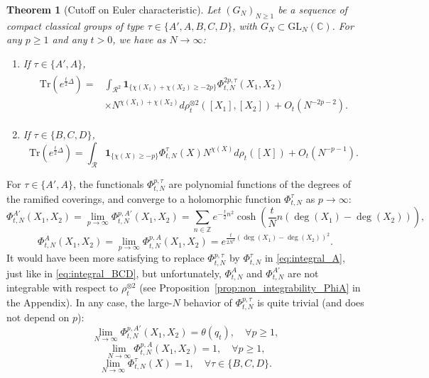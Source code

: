 \documentclass[11pt,a4paper,reqno]{article}
\newtheorem{theorem}{Theorem}[section]
\theoremstyle{definition}
\theoremstyle{remark}
\newcommand\GL{{\mathrm{GL}}}
\newcommand\Z{{\mathbb Z}}
\newcommand\C{\mathbb{C}}
\newcommand\Tr{\mathrm{Tr}}
\begin{document}
\begin{theorem}[Cutoff on Euler characteristic]\label{thm:mainbis}
Let $(G_N)_{N \geq 1}$ be a sequence of compact classical groups of type $\tau\in\{A',A,B,C,D\}$, with $G_N\subset\GL_N(\C)$. For any $p\geq 1$ and any $t>0$, we have as $N\to\infty$:
\begin{enumerate}
\item If $\tau\in\{A',A\}$, 
\begin{align}\label{eq:integral_A}
\begin{split}
\Tr(e^{\frac{t}{2}\Delta})= & \int_{\mathcal{R}^2}\mathbf{1}_{\{\chi(X_1)+\chi(X_2)\geq -2p\}} \Phi_{t,N}^{2p,\tau}(X_1,X_2)\\
&\times N^{\chi(X_1)+\chi(X_2)}d\rho_t^{\otimes 2}([X_1],[X_2])+O_t(N^{-2p-2}).
\end{split}
\end{align}
\item If $\tau\in\{B,C,D\}$, 
\begin{equation}\label{eq:integral_BCD}
\Tr(e^{\frac{t}{2}\Delta})=\int_{\mathcal{R}}\mathbf{1}_{\{\chi(X)\geq -p\}}\Phi_{t,N}^{\tau}(X)N^{\chi(X)}d\rho_t([X])+O_t(N^{-p-1}).
\end{equation}
\end{enumerate}
\end{theorem}

For $\tau\in\{A',A\}$, the functionals $\Phi_{t,N}^{p,\tau}$ are polynomial functions of the degrees of the ramified coverings, and converge to a holomorphic function $\Phi_{t,N}^{\tau}$ as $p\to\infty$:
\begin{equation}
\label{def:phiA'}
\Phi_{t,N}^{A'}(X_1,X_2)=\lim_{p\to\infty}\Phi_{t,N}^{p,A'}(X_1,X_2)=\sum_{n\in\Z}e^{-\frac{t}{2}n^2}\cosh\left(\frac{t}{N} n(\deg(X_1)-\deg(X_2))\right),
\end{equation}
\begin{equation}
\label{def:phiA}
\Phi_{t,N}^{A}(X_1,X_2)=\lim_{p\to\infty}\Phi_{t,N}^{p,A}(X_1,X_2)=e^{\frac{t}{2N^2}(\deg(X_1)-\deg(X_2))^2}.
\end{equation}
It would have been more satisfying to replace $\Phi_{t,N}^{p,\tau}$ by $\Phi_{t,N}^\tau$ in \eqref{eq:integral_A}, just like in \eqref{eq:integral_BCD}, but unfortunately, $\Phi_{t,N}^{A}$ and $\Phi_{t,N}^{A'}$ are not integrable with respect to $\rho_t^{\otimes 2}$ (see Proposition~\ref{prop:non_integrability_PhiA} in the Appendix). In any case, the large-$N$ behavior of $\Phi_{t,N}^{p,\tau}$ is quite trivial (and does not depend on $p$):
\[
\lim_{N\to\infty}\Phi_{t,N}^{p,A'}(X_1,X_2)=\theta(q_t),\quad \forall p\geq 1,
\]
\[
\lim_{N\to\infty}\Phi_{t,N}^{p,A}(X_1,X_2)=1,\quad \forall p\geq 1,
\]
\[
\lim_{N\to\infty}\Phi_{t,N}^{\tau}(X)=1,\quad \forall \tau\in\{B,C,D\}.
\]
\end{document}
